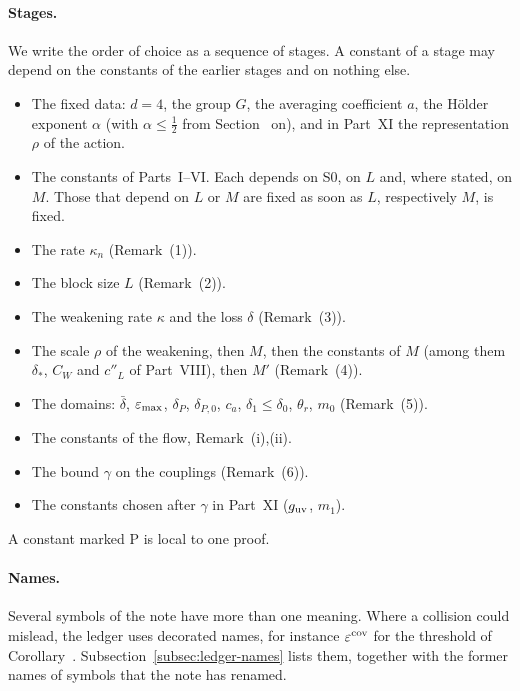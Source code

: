\paragraph{Stages.} We write the order of choice as a sequence of stages. A constant of a stage may depend on the constants of the earlier stages and on nothing else.
\begin{itemize}
\item[S0] The fixed data: $d=4$, the group $G$, the averaging coefficient $a$, the H\"older exponent $\alpha$ (with $\alpha\le\frac12$ from Section~ on), and in Part~XI the representation $\rho$ of the action.
\item[S\,I--VI] The constants of Parts~I--VI. Each depends on S0, on $L$ and, where stated, on $M$. Those that depend on $L$ or $M$ are fixed as soon as $L$, respectively $M$, is fixed.
\item[S1] The rate $\kappa_n$ (Remark~(1)).
\item[S2] The block size $L$ (Remark~(2)).
\item[S3] The weakening rate $\kappa$ and the loss $\delta$ (Remark~(3)).
\item[S4] The scale $\rho$ of the weakening, then $M$, then the constants of $M$ (among them $\delta_*$, $C_W$ and $c''_L$ of Part~VIII), then $M'$ (Remark~(4)).
\item[S5] The domains: $\bar\delta$, $\varepsilon_{\max}$, $\delta_P$, $\delta_{P,0}$, $c_a$, $\delta_1\le\delta_0$, $\theta_r$, $m_0$ (Remark~(5)).
\item[SF] The constants of the flow, Remark~(i),(ii).
\item[S6] The bound $\gamma$ on the couplings (Remark~(6)).
\item[SXI] The constants chosen after $\gamma$ in Part~XI ($g_{\rm uv}$, $m_1$).
\end{itemize}
A constant marked P is local to one proof.

\paragraph{Names.} Several symbols of the note have more than one meaning. Where a collision could mislead, the ledger uses decorated names, for instance $\varepsilon^{\rm cov}$ for the threshold of Corollary~. Subsection~\ref{subsec:ledger-names} lists them, together with the former names of symbols that the note has renamed.

